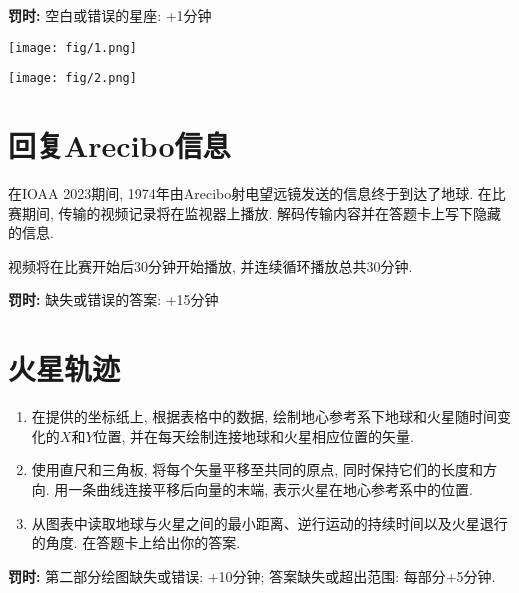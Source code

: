 \documentclass[a4paper,fontset=fandol]{ctexart}
\begin{document}
	\textbf{罚时: }空白或错误的星座: +1分钟
	
	\begin{center}
		\texttt{[image: fig/1.png]}
	\end{center}
	
	\begin{center}
		\texttt{[image: fig/2.png]}
	\end{center}
	
	\newpage
	\section{回复Arecibo信息}\label{2}
	
	在IOAA 2023期间, 1974年由Arecibo射电望远镜发送的信息终于到达了地球. 在比赛期间, 传输的视频记录将在监视器上播放. 解码传输内容并在答题卡上写下隐藏的信息. 
	
	视频将在比赛开始后30分钟开始播放, 并连续循环播放总共30分钟. 
	
	\textbf{罚时: }缺失或错误的答案: +15分钟
	
	\newpage
	\section{火星轨迹}
	
	\begin{enumerate}[label=(\alph*)]
		\item 在提供的坐标纸上, 根据表格中的数据, 绘制地心参考系下地球和火星随时间变化的$X$和$Y$位置, 并在每天绘制连接地球和火星相应位置的矢量. 
		
		\item 使用直尺和三角板, 将每个矢量平移至共同的原点, 同时保持它们的长度和方向. 用一条曲线连接平移后向量的末端, 表示火星在地心参考系中的位置. 
		
		\item 从图表中读取地球与火星之间的最小距离、逆行运动的持续时间以及火星退行的角度. 在答题卡上给出你的答案. 
	\end{enumerate}
	
	\textbf{罚时: }第二部分绘图缺失或错误: +10分钟; 答案缺失或超出范围: 每部分+5分钟. 
	
\end{document}
